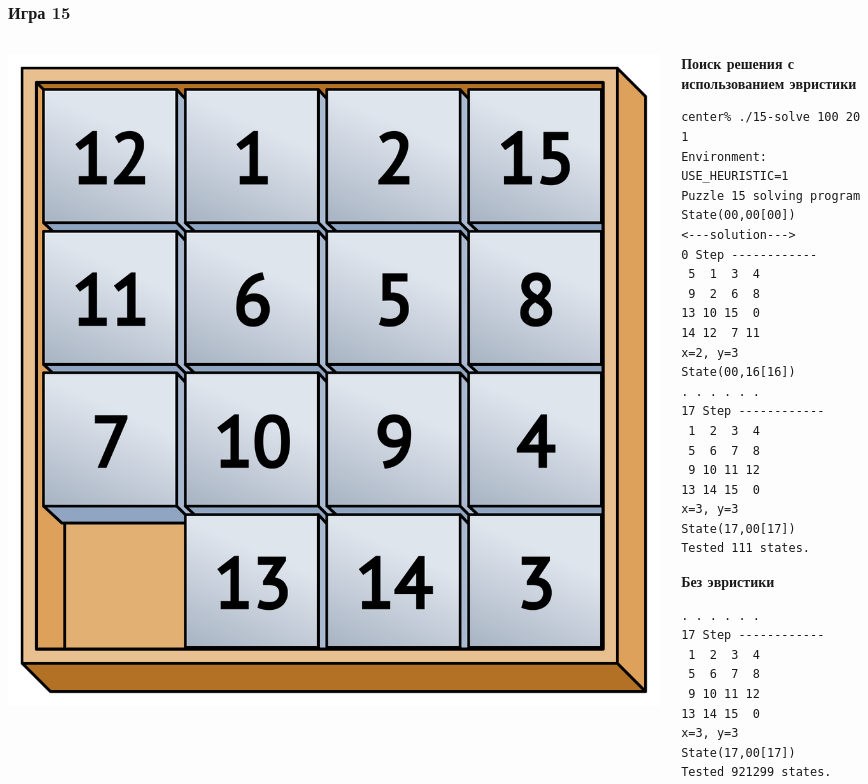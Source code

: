\documentclass[10pt]{beamer}
\begin{document}
\begin{frame}[fragile]
  \frametitle{Игра 15}
  \begin{columns}
    \begin{column}{0.5\textwidth}
      \includegraphics[width=1\linewidth]{pics/15-puzzle_magical.pdf}
    \end{column}
    \begin{column}{0.5\textwidth}
\textbf{Поиск решения с использованием эвристики}
\begin{verbatim}
center% ./15-solve 100 20 1
Environment:
USE_HEURISTIC=1
Puzzle 15 solving program
State(00,00[00])
<---solution--->
0 Step ------------
 5  1  3  4
 9  2  6  8
13 10 15  0
14 12  7 11
x=2, y=3
State(00,16[16])
. . . . . .
17 Step ------------
 1  2  3  4
 5  6  7  8
 9 10 11 12
13 14 15  0
x=3, y=3
State(17,00[17])
Tested 111 states.
\end{verbatim}
\textbf{Без эвристики}
\begin{verbatim}
. . . . . .
17 Step ------------
 1  2  3  4
 5  6  7  8
 9 10 11 12
13 14 15  0
x=3, y=3
State(17,00[17])
Tested 921299 states.
\end{verbatim}
    \end{column}
  \end{columns}
\end{frame}
\end{document}
